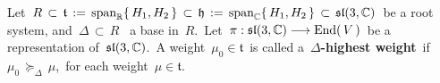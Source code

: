 \vskip 0.5cm
\begin{definition}
\mbox{}
\vskip 0.05cm
\noindent
Let
\,$R \,\subset\, \mathfrak{t} \,:=\, \textnormal{span}_{\mathbb{R}}\{\,H_{1},H_{2}\,\} \,\subset\, \mathfrak{h} \,:=\, \textnormal{span}_{\mathbb{C}}\{\,H_{1},H_{2}\,\} \,\subset\, \mathfrak{sl}(3,\mathbb{C})$\,
be a root system, and
\,$\Delta \,\subset\, R$ \, a base in \,$R$.\,
Let
\,$\pi : \mathfrak{sl}(3,\mathbb{C}) \longrightarrow \textnormal{End}(\,V\,)$\,
be a representation of \,$\mathfrak{sl}(3,\mathbb{C})$.\,
A weight \,$\mu_{0} \in \mathfrak{t}$\, is called a \,\textbf{$\Delta$-highest weight}\,
if \,$\mu_{0} \,\succeq_{\Delta}\, \mu$,\, for each weight \,$\mu \in \mathfrak{t}$.\,
\end{definition}


